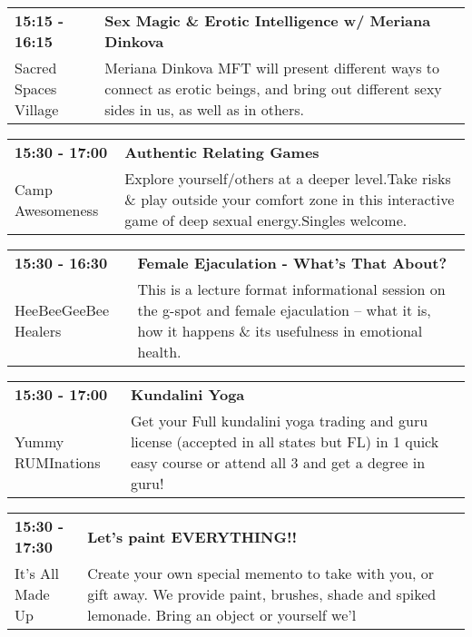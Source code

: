 \begin{tabular}{ p{1in} p{2.2in} }
    \textbf{15:15 - 16:15} & \textbf{Sex Magic \& Erotic Intelligence w/ Meriana Dinkova} \\
    Sacred Spaces Village \newline  & Meriana Dinkova MFT will present different ways to connect as erotic beings, and bring out different sexy sides in us, as well as in others. \\
    \hline 
\end{tabular}
    
\begin{tabular}{ p{1in} p{2.2in} }
    \textbf{15:30 - 17:00} & \textbf{Authentic Relating Games} \\
    Camp Awesomeness \newline  & Explore yourself/others at a deeper level.Take risks \& play outside your comfort zone in this interactive game of deep sexual energy.Singles welcome. \\
    \hline 
\end{tabular}
    
\begin{tabular}{ p{1in} p{2.2in} }
    \textbf{15:30 - 16:30} & \textbf{Female Ejaculation - What's That About?} \\
    HeeBeeGeeBee Healers \newline  & This is a lecture format informational session on the g-spot and female ejaculation -- what it is, how it happens \& its usefulness in emotional health. \\
    \hline 
\end{tabular}
    
\begin{tabular}{ p{1in} p{2.2in} }
    \textbf{15:30 - 17:00} & \textbf{Kundalini Yoga} \\
    Yummy RUMInations \newline  & Get your Full kundalini yoga trading and guru license (accepted in all states but FL) in 1 quick easy course or attend all 3 and get a degree in guru! \\
    \hline 
\end{tabular}
    
\begin{tabular}{ p{1in} p{2.2in} }
    \textbf{15:30 - 17:30} & \textbf{Let's paint EVERYTHING!!} \\
    It's All Made Up \newline  & Create your own special memento to take with you, or gift away. We provide paint, brushes, shade and spiked lemonade. Bring an object or yourself we'l \\
    \hline 
\end{tabular}
    
